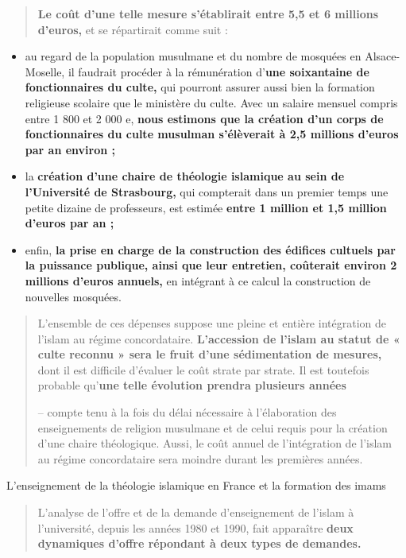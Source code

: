 \begin{quote}
\textbf{Le coût d'une telle mesure s'établirait entre 5,5 et 6 millions
d'euros,} et se répartirait comme suit :
\end{quote}

\begin{itemize}
\item
  au regard de la population musulmane et du nombre de mosquées en
  Alsace- Moselle, il faudrait procéder à la rémunération d'\textbf{une
  soixantaine de fonctionnaires du culte,} qui pourront assurer aussi
  bien la formation religieuse scolaire que le ministère du culte. Avec
  un salaire mensuel compris entre 1 800 et 2 000 e, \textbf{nous
  estimons que la création d'un corps de fonctionnaires du culte
  musulman s'élèverait à 2,5 millions d'euros par an environ ;}
\item
  la \textbf{création d'une chaire de théologie islamique au sein de
  l'Université de Strasbourg,} qui compterait dans un premier temps une
  petite dizaine de professeurs, est estimée \textbf{entre 1 million et
  1,5 million d'euros par an ;}
\item
  enfin, \textbf{la prise en charge de la construction des édifices
  cultuels par la puissance publique, ainsi que leur entretien,
  coûterait environ 2 millions d'euros annuels,} en intégrant à ce
  calcul la construction de nouvelles mosquées.
\end{itemize}

\begin{quote}
L'ensemble de ces dépenses suppose une pleine et entière intégration de
l'islam au régime concordataire. \textbf{L'accession de l'islam au
statut de « culte reconnu » sera le fruit d'une sédimentation de
mesures,} dont il est difficile d'évaluer le coût strate par strate. Il
est toutefois probable qu'\textbf{une telle évolution prendra plusieurs
années}

-- compte tenu à la fois du délai nécessaire à l'élaboration des
enseignements de religion musulmane et de celui requis pour la création
d'une chaire théologique. Aussi, le coût annuel de l'intégration de
l'islam au régime concordataire sera moindre durant les premières
années.


\end{quote}

L'enseignement de la théologie islamique en France et la formation des
imams

\begin{quote}
L'analyse de l'offre et de la demande d'enseignement de l'islam à
l'université, depuis les années 1980 et 1990, fait apparaître
\textbf{deux dynamiques d'offre répondant à deux types de demandes.}
\end{quote}

